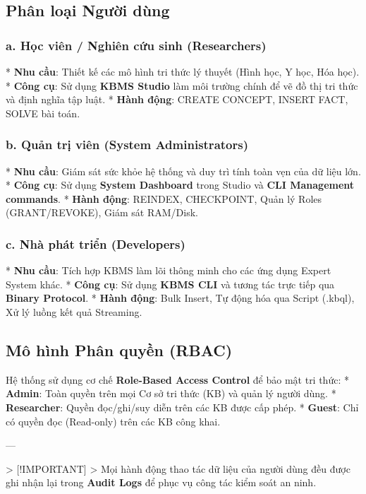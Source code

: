\subsection{Phân loại Người dùng}

\subsubsection{a. Học viên / Nghiên cứu sinh (Researchers)}
*   \textbf{Nhu cầu}: Thiết kế các mô hình tri thức lý thuyết (Hình học, Y học, Hóa học).
*   \textbf{Công cụ}: Sử dụng \textbf{KBMS Studio} làm môi trường chính để vẽ đồ thị tri thức và định nghĩa tập luật.
*   \textbf{Hành động}: CREATE CONCEPT, INSERT FACT, SOLVE bài toán.

\subsubsection{b. Quản trị viên (System Administrators)}
*   \textbf{Nhu cầu}: Giám sát sức khỏe hệ thống và duy trì tính toàn vẹn của dữ liệu lớn.
*   \textbf{Công cụ}: Sử dụng \textbf{System Dashboard} trong Studio và \textbf{CLI Management commands}.
*   \textbf{Hành động}: REINDEX, CHECKPOINT, Quản lý Roles (GRANT/REVOKE), Giám sát RAM/Disk.

\subsubsection{c. Nhà phát triển (Developers)}
*   \textbf{Nhu cầu}: Tích hợp KBMS làm lõi thông minh cho các ứng dụng Expert System khác.
*   \textbf{Công cụ}: Sử dụng \textbf{KBMS CLI} và tương tác trực tiếp qua \textbf{Binary Protocol}.
*   \textbf{Hành động}: Bulk Insert, Tự động hóa qua Script (.kbql), Xử lý luồng kết quả Streaming.

\subsection{Mô hình Phân quyền (RBAC)}

Hệ thống sử dụng cơ chế \textbf{Role-Based Access Control} để bảo mật tri thức:
*   \textbf{Admin}: Toàn quyền trên mọi Cơ sở tri thức (KB) và quản lý người dùng.
*   \textbf{Researcher}: Quyền đọc/ghi/suy diễn trên các KB được cấp phép.
*   \textbf{Guest}: Chỉ có quyền đọc (Read-only) trên các KB công khai.

---

> [!IMPORTANT]
> Mọi hành động thao tác dữ liệu của người dùng đều được ghi nhận lại trong \textbf{Audit Logs} để phục vụ công tác kiểm soát an ninh.

